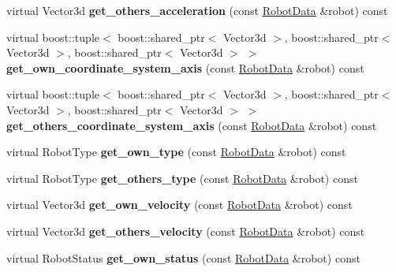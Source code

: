 \begin{CompactItemize}
\item 
\hypertarget{class_view_3e6f92a4b5ea3e4201db27e0e9863f50}{
virtual Vector3d \textbf{get\_\-others\_\-acceleration} (const \hyperlink{class_robot_data}{RobotData} \&robot) const }
\label{class_view_3e6f92a4b5ea3e4201db27e0e9863f50}

\item 
\hypertarget{class_view_c4f04d6595dc1fb83751d17c42ce544c}{
virtual boost::tuple$<$ boost::shared\_\-ptr$<$ Vector3d $>$, boost::shared\_\-ptr$<$ Vector3d $>$, boost::shared\_\-ptr$<$ Vector3d $>$ $>$ \textbf{get\_\-own\_\-coordinate\_\-system\_\-axis} (const \hyperlink{class_robot_data}{RobotData} \&robot) const }
\label{class_view_c4f04d6595dc1fb83751d17c42ce544c}

\item 
\hypertarget{class_view_eed120c2bfefb7202d4402b77d432f8f}{
virtual boost::tuple$<$ boost::shared\_\-ptr$<$ Vector3d $>$, boost::shared\_\-ptr$<$ Vector3d $>$, boost::shared\_\-ptr$<$ Vector3d $>$ $>$ \textbf{get\_\-others\_\-coordinate\_\-system\_\-axis} (const \hyperlink{class_robot_data}{RobotData} \&robot) const }
\label{class_view_eed120c2bfefb7202d4402b77d432f8f}

\item 
\hypertarget{class_view_580b47540374e46099fa73515a372571}{
virtual RobotType \textbf{get\_\-own\_\-type} (const \hyperlink{class_robot_data}{RobotData} \&robot) const }
\label{class_view_580b47540374e46099fa73515a372571}

\item 
\hypertarget{class_view_37ed113fedcce3a5589ac088b70551d4}{
virtual RobotType \textbf{get\_\-others\_\-type} (const \hyperlink{class_robot_data}{RobotData} \&robot) const }
\label{class_view_37ed113fedcce3a5589ac088b70551d4}

\item 
\hypertarget{class_view_ce6be029d20d03891468aca61961e6d5}{
virtual Vector3d \textbf{get\_\-own\_\-velocity} (const \hyperlink{class_robot_data}{RobotData} \&robot) const }
\label{class_view_ce6be029d20d03891468aca61961e6d5}

\item 
\hypertarget{class_view_6d4aca6107649cb75a133745e860f8e3}{
virtual Vector3d \textbf{get\_\-others\_\-velocity} (const \hyperlink{class_robot_data}{RobotData} \&robot) const }
\label{class_view_6d4aca6107649cb75a133745e860f8e3}

\item 
\hypertarget{class_view_8dfd78e2f19f9bb1a6cdafcebb28b78e}{
virtual RobotStatus \textbf{get\_\-own\_\-status} (const \hyperlink{class_robot_data}{RobotData} \&robot) const }
\label{class_view_8dfd78e2f19f9bb1a6cdafcebb28b78e}


\end{CompactItemize}
